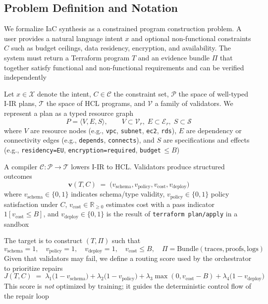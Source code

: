 \documentclass[manuscript,screen,nonacm]{acmart}
\begin{document}
\subsection{Problem Definition and Notation}
\label{sec:problem}

We formalize IaC synthesis as a constrained program construction problem. A user provides a natural language intent $x$ and optional non-functional constraints $C$ such as budget ceilings, data residency, encryption, and availability. The system must return a Terraform program $T$ and an evidence bundle $\Pi$ that together satisfy functional and non-functional requirements and can be verified independently

Let $x \in \mathcal{X}$ denote the intent, $C \in \mathcal{C}$ the constraint set, $\mathcal{P}$ the space of well-typed I-IR plans, $\mathcal{T}$ the space of HCL programs, and $\mathcal{V}$ a family of validators. We represent a plan as a typed resource graph
\begin{equation}
P = \langle V, E, S \rangle,\qquad V \subset \mathcal{V}_r,\; E \subset \mathcal{E}_r,\; S \subset \mathcal{S}
\end{equation}
where $V$ are resource nodes (e.g., \texttt{vpc}, \texttt{subnet}, \texttt{ec2}, \texttt{rds}), $E$ are dependency or connectivity edges (e.g., \texttt{depends}, \texttt{connects}), and $S$ are specifications and effects (e.g., \texttt{residency=EU}, \texttt{encryption=required}, \texttt{budget}\,$\le B$)

A compiler $\mathcal{C}:\mathcal{P}\rightarrow\mathcal{T}$ lowers I-IR to HCL. Validators produce structured outcomes
\begin{equation}
\mathbf{v}(T, C) \;=\; \big( v_{\text{schema}}, v_{\text{policy}}, v_{\text{cost}}, v_{\text{deploy}} \big)
\end{equation}
where $v_{\text{schema}} \in \{0,1\}$ indicates schema/type validity, $v_{\text{policy}} \in \{0,1\}$ policy satisfaction under $C$, $v_{\text{cost}} \in \mathbb{R}_{\ge 0}$ estimates cost with a pass indicator $1\!\left[v_{\text{cost}} \le B\right]$, and $v_{\text{deploy}} \in \{0,1\}$ is the result of \texttt{terraform plan/apply} in a sandbox

The target is to construct $(T,\Pi)$ such that
\begin{equation}
v_{\text{schema}} = 1,\quad v_{\text{policy}} = 1,\quad v_{\text{deploy}} = 1,\quad v_{\text{cost}} \le B,\quad \Pi = \mathrm{Bundle}(\text{traces},\text{proofs},\text{logs})
\end{equation}
Given that validators may fail, we define a routing score used by the orchestrator to prioritize repairs
\begin{equation}
J(T,C) \;=\; \lambda_1 \big(1 - v_{\text{schema}}\big) + \lambda_2 \big(1 - v_{\text{policy}}\big) + \lambda_3 \max(0, v_{\text{cost}} - B) + \lambda_4 \big(1 - v_{\text{deploy}}\big)
\label{eq:routing}
\end{equation}
This score is \emph{not} optimized by training; it guides the deterministic control flow of the repair loop
\end{document}
